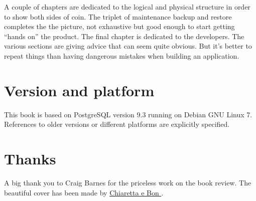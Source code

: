 \documentclass[oneside]{book}
\begin{document}
A couple of chapters are dedicated to the logical and physical structure in
order to show both sides of coin.  The triplet of maintenance backup and restore completes the 
the picture, not exhaustive but good enough to start getting ``hands on'' the product.
The final chapter is dedicated to the developers. The various sections are 
giving advice that can seem quite obvious. But it's better to repeat things than having dangerous 
mistakes when building an application. 

\section*{Version and platform}
This book is based on PostgreSQL version 9.3 running on Debian GNU Linux 7.
References to older versions or different platforms are explicitly specified.

\section*{Thanks}
A big thank you to Craig Barnes for the priceless work on the book review.\newline
The beautiful cover has been made by \href{http://www.bonland.eu/}{
Chiaretta e Bon }.\newline














\appendix

\listoffigures
\listoftables
\printindex{}
\end{document}
